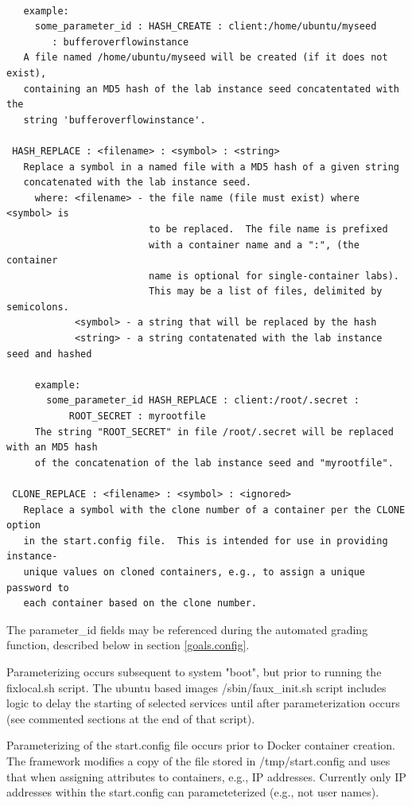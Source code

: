 \documentclass[12pt]{article}
\begin{document}
\begin{verbatim}
                   
   example:
     some_parameter_id : HASH_CREATE : client:/home/ubuntu/myseed 
        : bufferoverflowinstance
   A file named /home/ubuntu/myseed will be created (if it does not exist), 
   containing an MD5 hash of the lab instance seed concatentated with the 
   string 'bufferoverflowinstance'.
 
 HASH_REPLACE : <filename> : <symbol> : <string>
   Replace a symbol in a named file with a MD5 hash of a given string 
   concatenated with the lab instance seed.
     where: <filename> - the file name (file must exist) where <symbol> is 
                         to be replaced.  The file name is prefixed 
                         with a container name and a ":", (the container 
                         name is optional for single-container labs).  
                         This may be a list of files, delimited by semicolons. 
            <symbol> - a string that will be replaced by the hash
            <string> - a string contatenated with the lab instance seed and hashed

     example:
       some_parameter_id HASH_REPLACE : client:/root/.secret : 
           ROOT_SECRET : myrootfile
     The string "ROOT_SECRET" in file /root/.secret will be replaced with an MD5 hash
     of the concatenation of the lab instance seed and "myrootfile".

 CLONE_REPLACE : <filename> : <symbol> : <ignored>
   Replace a symbol with the clone number of a container per the CLONE option
   in the start.config file.  This is intended for use in providing instance-
   unique values on cloned containers, e.g., to assign a unique password to
   each container based on the clone number.
\end{verbatim}

The parameter\_id fields may be referenced during the automated grading function, described below
in section \ref{goals.config}. 

Parameterizing occurs subsequent to system "boot", but prior to running the fixlocal.sh script.
The ubuntu based images /sbin/faux\_init.sh  script includes logic to delay the starting of 
selected services until after parameterization occurs (see commented sections at the end of that script).

Parameterizing of the start.config file occurs prior to Docker container creation.  The framework 
modifies a copy of the file stored in /tmp/start.config and uses that when assigning attributes to containers,
e.g., IP addresses. Currently only IP addresses within the start.config can parameteterized (e.g., not user names).
\end{document}
